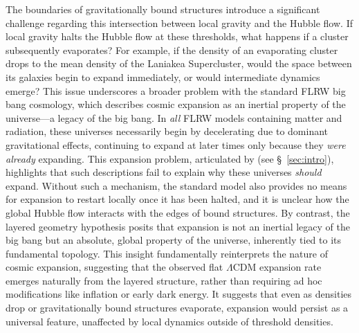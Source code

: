 \documentclass[aps,rmp,groupedaddress,twocolumn,10pt]{revtex4-2}
\begin{document}
The boundaries of gravitationally bound structures introduce a significant challenge regarding this intersection between local gravity and the Hubble flow. If local gravity halts the Hubble flow at these thresholds, what happens if a cluster subsequently evaporates? For example, if the density of an evaporating cluster drops to the mean density of the Laniakea Supercluster, would the space between its galaxies begin to expand immediately, or would intermediate dynamics emerge? This issue underscores a broader problem with the standard FLRW big bang cosmology, which describes cosmic expansion as an inertial property of the universe---a legacy of the big bang. In \textit{all} FLRW models containing matter and radiation, these universes necessarily begin by decelerating due to dominant gravitational effects, continuing to expand at later times only because they \textit{were already} expanding. This expansion problem, articulated by \citet{Eddington1933} (see \S~\ref{sec:intro}), highlights that such descriptions fail to explain why these universes \textit{should} expand. Without such a mechanism, the standard model also provides no means for expansion to restart locally once it has been halted, and it is unclear how the global Hubble flow interacts with the edges of bound structures. By contrast, the layered geometry hypothesis posits that expansion is not an inertial legacy of the big bang but an absolute, global property of the universe, inherently tied to its fundamental topology. This insight fundamentally reinterprets the nature of cosmic expansion, suggesting that the observed flat $\Lambda$CDM expansion rate emerges naturally from the layered structure, rather than requiring ad hoc modifications like inflation or early dark energy. It suggests that even as densities drop or gravitationally bound structures evaporate, expansion would persist as a universal feature, unaffected by local dynamics outside of threshold densities.
\end{document}
